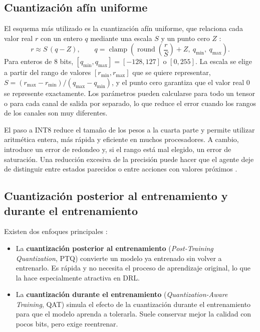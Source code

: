 \subsection{Cuantización afín uniforme}

El esquema más utilizado es la cuantización afín uniforme, que relaciona cada valor real $r$ con un entero $q$ mediante una escala $S$ y un punto cero $Z$ \cite{jacob2018quantization}:
\begin{equation}\label{eq:cuant_afin}
	r \approx S\,(q - Z), \qquad q = \operatorname{clamp}\left(\operatorname{round}\left(\frac{r}{S}\right) + Z,\ q_{\min},\ q_{\max}\right).
\end{equation}
Para enteros de 8 bits, $[q_{\min}, q_{\max}] = [-128, 127]$ o $[0, 255]$. La escala se elige a partir del rango de valores $[r_{\min}, r_{\max}]$ que se quiere representar, $S = (r_{\max} - r_{\min})/(q_{\max} - q_{\min})$, y el punto cero garantiza que el valor real $0$ se represente exactamente. Los parámetros pueden calcularse para todo un tensor o para cada canal de salida por separado, lo que reduce el error cuando los rangos de los canales son muy diferentes.

El paso a INT8 reduce el tamaño de los pesos a la cuarta parte y permite utilizar aritmética entera, más rápida y eficiente en muchos procesadores. A cambio, introduce un error de redondeo y, si el rango está mal elegido, un error de saturación. Una reducción excesiva de la precisión puede hacer que el agente deje de distinguir entre estados parecidos o entre acciones con valores próximos \cite{ivanov2025neural}.

\subsection{Cuantización posterior al entrenamiento y durante el entrenamiento}

Existen dos enfoques principales \cite{nagel2021white}:
\begin{itemize}
	\item La \textbf{cuantización posterior al entrenamiento} (\textit{Post-Training Quantization}, PTQ) convierte un modelo ya entrenado sin volver a entrenarlo. Es rápida y no necesita el proceso de aprendizaje original, lo que la hace especialmente atractiva en DRL.
	\item La \textbf{cuantización durante el entrenamiento} (\textit{Quantization-Aware Training}, QAT) simula el efecto de la cuantización durante el entrenamiento para que el modelo aprenda a tolerarla. Suele conservar mejor la calidad con pocos bits, pero exige reentrenar.
\end{itemize}

